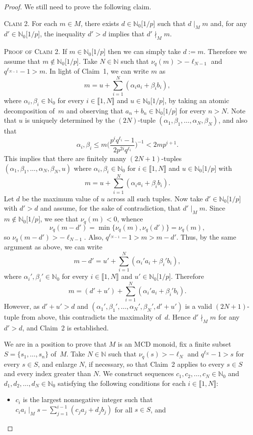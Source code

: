 \documentclass[10pt]{amsart}
\theoremstyle{definition}
\theoremstyle{remark}
\numberwithin{equation}{section}
\newcommand{\nn}{\mathbb{N}}
\providecommand\ldb{\llbracket}
\providecommand\rdb{\rrbracket}
\begin{document}
\begin{proof}
  We still need to prove the following claim.
  \smallskip
  
  \noindent \textsc{Claim 2.} For each $m \in M$, there exists $d \in \nn_0\big[1/p\big]$ such that $d \mid_M m$ and, for any $d' \in \nn_0\big[1/p\big]$, the inequality $d'>d$ implies that $d' \nmid_M m$.
  \smallskip

  \noindent \textsc{Proof of Claim 2.} If $m \in \nn_0\big[1/p\big]$ then we can simply take $d:=m$. Therefore we assume that $m \notin \nn_0\big[1/p\big]$. Take $N \in \nn$ such that $\nu_q(m)>-\ell_{N-1}$ and $q^{\ell_{N-1}}-1>m$. In light of Claim~1, we can write $m$ as
  \[
    m = u + \sum_{i=1}^N \left(\alpha_i a_i + \beta_i b_i\right),
  \]
  where $\alpha_i,\beta_i \in \nn_0$ for every $i \in \ldb 1,N \rdb$ and $u \in \nn_0\big[1/p\big]$, by taking an atomic decomposition of~$m$ and observing that $a_n+b_n \in \nn_0\big[1/p\big]$ for every $n>N$. Note that $u$ is uniquely determined by the $(2N)$-tuple $(\alpha_1,\beta_1,\dots,\alpha_N,\beta_N)$, and also that
  \[
    \alpha_i,\beta_i \le m \bigg( \frac{p^iq^{\ell_i}-1}{2p^{2i}q^{\ell_i}} \bigg)^{-1} < 2mp^{i+1}.
  \]
  This implies that there are finitely many $(2N+1)$-tuples $(\alpha_1,\beta_1,\dots,\alpha_N,\beta_N,u)$ where $\alpha_i,\beta_i \in \nn_0$ for $i \in \ldb 1,N \rdb$ and $u \in \nn_0\big[1/p\big]$ with
  \[
    m = u+\sum_{i=1}^N \left(\alpha_i a_i + \beta_i b_i \right).
  \]
  Let $d$ be the maximum value of $u$ across all such tuples. Now take $d' \in \nn_0\big[1/p\big]$ with $d'>d$ and assume, for the sake of contradiction, that $d' \mid_M m$. Since $m \notin \nn_0\big[1/p\big]$, we see that $\nu_q(m)<0$, whence
  \[
    \nu_q(m-d')=\min\{\nu_q(m),\nu_q(d')\}=\nu_q(m),
  \]
  so $\nu_q(m-d')>-\ell_{N-1}$. Also, $q^{\ell_{N-1}}-1>m>m-d'$. Thus, by the same argument as above, we can write
  \[
    m-d'=u'+\sum_{i=1}^N \left(\alpha_i'a_i + \beta_i'b_i\right),
  \]
  where $\alpha_i',\beta_i' \in \nn_0$ for every $i \in \ldb 1,N \rdb$ and $u' \in \nn_0\big[1/p\big]$. Therefore
  \[
    m=(d'+u')+\sum_{i=1}^N \left(\alpha_i'a_i + \beta_i'b_i\right).
  \]
  However, as $d'+u'>d$ and $(\alpha_1',\beta_1',\dots,\alpha_N',\beta_N',d'+u')$ is a valid $(2N+1)$-tuple from above, this contradicts the maximality of~$d$. Hence $d' \nmid_M m$ for any $d'>d$, and Claim~2 is established.
  \smallskip

  We are in a position to prove that $M$ is an MCD monoid, fix a finite subset $S=\{s_1,\dots,s_n\}$ of~$M$. Take $N \in \nn$ such that $\nu_q(s)>-\ell_N$ and $q^{\ell_N}-1>s$ for every $s \in S$, and enlarge $N$, if necessary, so that Claim~2 applies to every $s \in S$ and every index greater than $N$. We construct sequences $c_1,c_2,\dots,c_N \in \nn_0$ and $d_1,d_2,\dots,d_N \in \nn_0$ satisfying the following conditions for each $i \in \ldb 1,N \rdb$:
  \begin{itemize}
    \item $c_i$ is the largest nonnegative integer such that $c_ia_i \mid_M s-\sum_{j=1}^{i-1}(c_ja_j+d_jb_j)$ for all $s \in S$, and
    \smallskip
    

\end{itemize}
\end{proof}
\end{document}
